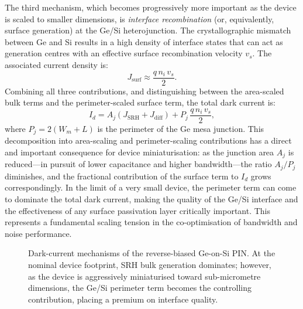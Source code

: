 The third mechanism, which becomes progressively more important as the device
is scaled to smaller dimensions, is \emph{interface recombination} (or,
equivalently, surface generation) at the Ge/Si heterojunction. The
crystallographic mismatch between Ge and Si results in a high density of
interface states that can act as generation centres with an effective surface
recombination velocity $v_s$. The associated current density is:
\begin{equation}
    J_{\mathrm{surf}} \approx \frac{q\,n_i\,v_s}{2}.
    \label{eq:metrics_jdark_surf}
\end{equation}
Combining all three contributions, and distinguishing between the area-scaled
bulk terms and the perimeter-scaled surface term, the total dark current is:
\begin{equation}
    I_d = A_j\!\left(J_{\mathrm{SRH}} + J_{\mathrm{diff}}\right)
    + P_j\,\frac{q\,n_i\,v_s}{2},
    \label{eq:metrics_idark_decomposed}
\end{equation}
where $P_j = 2(W_m + L)$ is the perimeter of the Ge mesa junction. This
decomposition into area-scaling and perimeter-scaling contributions has a
direct and important consequence for device miniaturisation: as the junction
area $A_j$ is reduced---in pursuit of lower capacitance and higher
bandwidth---the ratio $A_j / P_j$ diminishes, and the fractional contribution
of the surface term to $I_d$ grows correspondingly. In the limit of a very
small device, the perimeter term can come to dominate the total dark current,
making the quality of the Ge/Si interface and the effectiveness of any surface
passivation layer critically important. This represents a fundamental scaling
tension in the co-optimisation of bandwidth and noise performance.

\begin{figure}[H]
    \centering
    \caption{Dark-current mechanisms of the reverse-biased Ge-on-Si PIN.
    At the nominal device footprint, SRH bulk generation dominates; however,
    as the device is aggressively miniaturised toward sub-micrometre dimensions,
    the Ge/Si perimeter term becomes the controlling contribution, placing a
    premium on interface quality.}
    \label{fig:dark_current_concept}
\end{figure}

